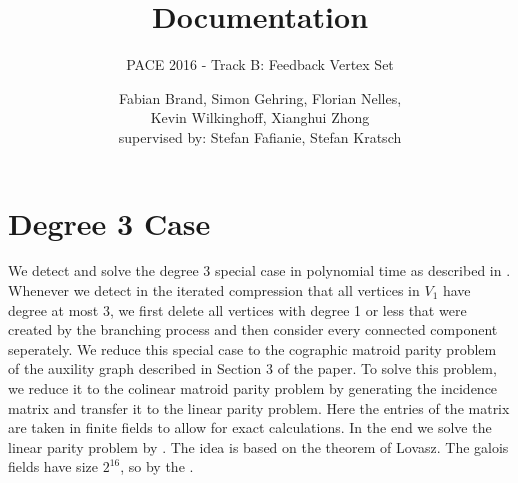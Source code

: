 \documentclass[11pt,a4paper]{scrartcl}
\begin{document}
\title{Documentation}
\subtitle{PACE 2016 - Track B: Feedback Vertex Set}
\author{Fabian Brand, Simon Gehring, Florian Nelles,\\ Kevin Wilkinghoff, Xianghui Zhong\\
	supervised by: Stefan Fafianie, Stefan Kratsch}
\maketitle

\section{Degree 3 Case}

We detect and solve the degree 3 special case in polynomial time as described in \cite{DBLP:journals/corr/abs-1004-1672}. Whenever we detect in the iterated compression that all vertices in $V_1$ have degree at most 3, we first delete all vertices with degree 1 or less that were created by the branching process and then consider every connected component seperately. We reduce this special case to the cographic matroid parity problem of the auxility graph described in Section 3 of the paper. To solve this problem, we reduce it to the colinear matroid parity problem by generating the incidence matrix and transfer it to the linear parity problem. Here the entries of the matrix are taken in finite fields to allow for exact calculations. In the end we solve the linear parity problem by \cite{Cheung:2014:AAL:2620785.2601066}. The idea is based on the theorem of Lovasz. The galois fields have size $2^{16}$, so by the .

\nocite{bafna1999}
\nocite{chen2008}


\end{document}
